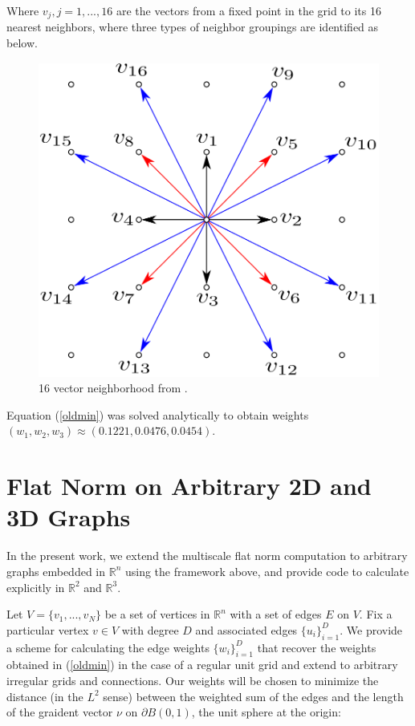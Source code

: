 \documentclass[12pt]{article}
\begin{document}
Where $v_j, j= 1,...,16$ are the vectors from a fixed point in the grid to its 16 nearest neighbors, where three types of neighbor groupings are identified as below.

\begin{figure}[H]
\centering
\includegraphics[scale=0.25]{Figure_2_Vixie_Paper.png}
\caption{16 vector neighborhood from \cite{shapes}.}
\end{figure}

Equation (\ref{oldmin}) was solved analytically to obtain weights $(w_1,w_2,w_3) \approx (0.1221,0.0476,0.0454)$. 


\section{Flat Norm on Arbitrary 2D and 3D Graphs}

In the present work, we extend the multiscale flat norm computation to arbitrary graphs embedded in $\mathbb{R}^n$ using the framework above, and provide code to calculate explicitly in $\mathbb{R}^2$ and $\mathbb{R}^3$.

Let $V = \{v_1,...,v_N\}$ be a set of vertices in $\mathbb{R}^n$ with a set of edges $E$ on $V$. Fix a particular vertex $v \in V$ with degree $D$ and associated edges  $\{u_i\}_{i=1}^D$. We provide a scheme for calculating the edge weights $\{w_i\}_{i=1}^D$ that recover the weights obtained in (\ref{oldmin}) in the case of a regular unit grid and extend to arbitrary irregular grids and connections. Our weights will be chosen to minimize the distance (in the $L^2$ sense) between the weighted sum of the edges and the length of the graident vector $\nu$ on $\partial B(0,1)$, the unit sphere at the origin:
\end{document}
